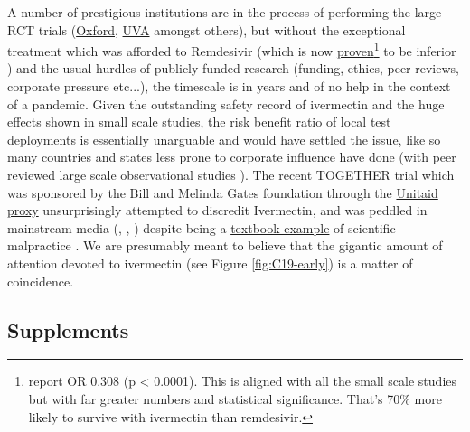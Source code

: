 \documentclass[11pt,a4paper,notitlepage]{report}
\begin{document}
A number of prestigious institutions are in the process of performing the large RCT trials (\href{https://www.principletrial.org/news/ivermectin-to-be-investigated-as-a-possible-treatment-for-covid-19-in-oxford2019s-principle-trial}{Oxford}, \href{https://news.virginia.edu/content/uva-health-joins-national-trial-testing-medications-mild-moderate-covid-19}{UVA} amongst others), but without the exceptional treatment which was afforded to Remdesivir (which is now \href{https://www.sciencedirect.com/science/article/pii/S1201971221009887}{proven}\footnote{\citet{EFIMENKO2022S40} report OR 0.308 (p < 0.0001). This is aligned with all the small scale studies but with far greater numbers and statistical significance. That's 70\% more likely to survive with ivermectin than remdesivir.} to be inferior \cite{EFIMENKO2022S40}) and the usual hurdles of publicly funded research (funding, ethics, peer reviews, corporate pressure etc...), the timescale is in years and of no help in the context of a pandemic. Given the outstanding safety record of ivermectin and the huge effects shown in small scale studies, the risk benefit ratio of local test deployments is essentially unarguable and would have settled the issue, like so many countries and states less prone to corporate influence have done (with peer reviewed large scale observational studies \cite{Kerr2022-ps}). The recent TOGETHER trial which was sponsored by the Bill and Melinda Gates foundation through the \href{https://www.togethertrial.com/who-we-are}{Unitaid proxy} unsurprisingly attempted to discredit Ivermectin, and was peddled in mainstream media (\cite{nytimes01042022}, \cite{sydneymorningherald31032022}, \cite{fortune31032022}) despite being a \href{https://c19ivermectin.com/togetherivm.html}{textbook example} of scientific malpractice \cite{togetherivm}. We are presumably meant to believe that the gigantic amount of attention devoted to ivermectin (see Figure \ref{fig:C19-early}) is a matter of coincidence. 


\subsection*{Supplements}
\end{document}
